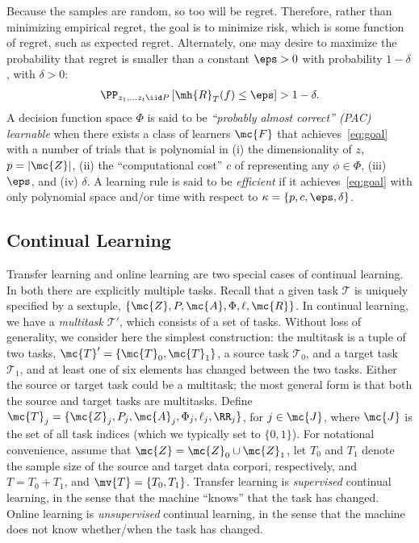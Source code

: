 \documentclass{article}
\begin{document}
Because the samples  are random, so too will be regret.  Therefore, rather than minimizing empirical regret, the goal is to minimize risk, which is some function of regret, such as expected regret. 
% 
Alternately, one may desire to maximize the probability that  regret is smaller than a constant $\eps>0$ with probability $1-\delta$, with $\delta> 0$:
\begin{align} \label{eq:goal}
    \PP_{ z_1,\ldots z_t \iid P} \left[\mh{R}_T(f)  \leq \eps \right] > 1 - \delta.
\end{align}
A decision function space $\Phi$ is said to be \emph{``probably almost correct'' (PAC) learnable} when there exists a class of learners $\mc{F}$ that achieves~\eqref{eq:goal} with a  number of trials that is polynomial in (i) the dimensionality of $z$, $p=|\mc{Z}|$, (ii) the ``computational cost'' $c$ of representing any $\phi \in \Phi$, (iii) $\eps$, and  (iv) $\delta$.  A learning rule is said to be \emph{efficient} if it achieves~\eqref{eq:goal} with only polynomial space and/or time with respect to $\kappa= \{p,c,\eps,\delta\}$.  



\subsection{Continual Learning}

Transfer learning and online learning are two special cases of continual learning.  In both there are explicitly multiple tasks. 
Recall that a given task $\mathcal{T}$ is uniquely specified by a sextuple, $\{\mc{Z}, P, \mc{A}, \Phi, \ell, \mc{R}\}$.  In continual learning, we have a \emph{multitask} $\mathcal{T}'$, which  consists of a set of tasks.  Without loss of generality, we consider here the simplest construction: the multitask is a tuple of two tasks, $\mc{T}'=\{\mc{T}_0, \mc{T}_1\}$,  a source task $\mathcal{T}_0$, and a target task $\mathcal{T}_1$, and at least one of six elements has changed between the two tasks.  Either the source or target task could be a multitask; the most general form is that both the source and target tasks are multitasks. 
Define $\mc{T}_j=\{\mc{Z}_j, P_j, \mc{A}_j, \Phi_j, \ell_j, \RR_j\}$, for $j \in \mc{J}$, where $\mc{J}$ is the set of all task indices (which we typically set to $\{0,1\}$).  
% 
For notational convenience, assume that $\mc{Z} = \mc{Z}_0 \cup \mc{Z}_1$, 
let $T_0$ and $T_1$ denote the  sample size of the source and target data corpori, respectively, and $T=T_0+T_1$, and $\mv{T}=\{T_0,T_1\}$. Transfer learning is \emph{supervised} continual learning, in the sense that the machine ``knows'' that the task has changed.  Online learning is \emph{unsupervised} continual learning, in the sense that the  machine does not know whether/when the task has changed. 
\end{document}
